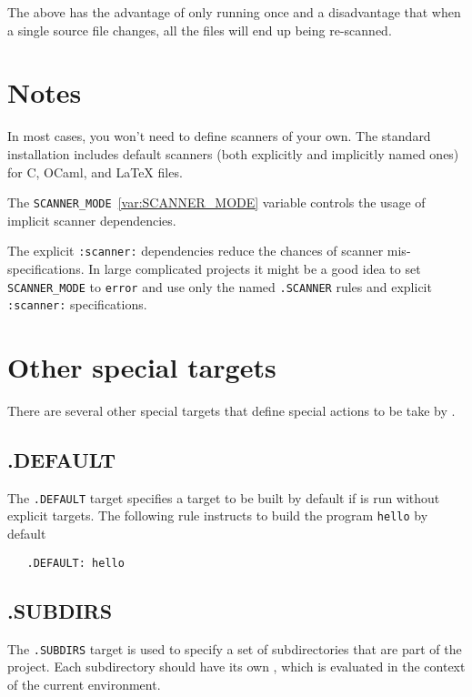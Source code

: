 The above has the advantage of only running  once and a disadvantage that when a single
source file changes, all the files will end up being re-scanned.

\section{Notes}

In most cases, you won't need to define scanners of your own.  The standard installation includes
default scanners (both explicitly and implicitly named ones) for C, OCaml, and \LaTeX{} files.

The \verb+SCANNER_MODE+~\ref{var:SCANNER_MODE} variable controls the usage of implicit scanner dependencies.

The explicit \verb+:scanner:+ dependencies reduce the chances of scanner mis-specifications. In
large complicated projects it might be a good idea to set \verb+SCANNER_MODE+ to \verb+error+ and
use only the named \verb+.SCANNER+ rules and explicit \verb+:scanner:+ specifications.

\section{Other special targets}

There are several other special targets that define special actions to be take by .

\subsection{.DEFAULT}

The \verb+.DEFAULT+ target specifies a target to be built by default
if  is run without explicit targets.  The following rule
instructs  to build the program \verb+hello+ by default

\begin{verbatim}
   .DEFAULT: hello
\end{verbatim}

\subsection{.SUBDIRS}
\label{target:.SUBDIRS}

The \verb+.SUBDIRS+ target is used to specify a set of subdirectories
that are part of the project.  Each subdirectory should have its own
, which is evaluated in the context of the current
environment.

